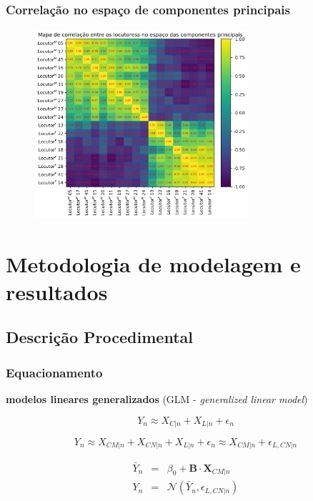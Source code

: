 \documentclass[121pt, aspectratio=169, t]{beamer}
\begin{document}
\begin{frame}[fragile=singleslide]
	\frametitle{Correlação no espaço de componentes principais}
	\begin{figure}
		\centering
		\includegraphics[height=7cm]{Correelacao_pca_loc.png}
	\end{figure}
\end{frame}
\section{Metodologia de modelagem e resultados}
\subsection{Descrição Procedimental}
\begin{frame}[fragile=singleslide]
	\frametitle{Equacionamento}
	\textbf{modelos lineares generalizados} (GLM - \textit{generalized linear model})
	
	\begin{equation}
		 Y_{n} \approx X_{C|n} + X_{L|n} + \epsilon_{n}
	\end{equation}

	\begin{equation}
		Y_{n} \approx X_{CM|n} + X_{CN|n} + X_{L|n} + \epsilon_{n} \approx X_{CM|n} + \epsilon_{L,CN|n}
	\end{equation}

	\begin{eqnarray}
		\bar{Y}_{n} &=& \beta_{0} +  \mathbf{B} \cdot \mathbf{X}_{CM|n} \nonumber \\
		Y_{n} &=& \mathcal{N} \left( \bar{Y}_{n} ,\epsilon_{L,CN|n} \right) 
	\end{eqnarray}

\end{frame}
\end{document}
